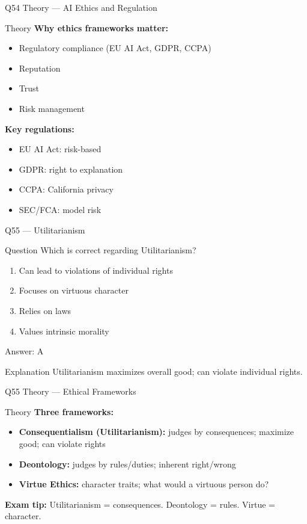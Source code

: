 \documentclass[aspectratio=169,8pt]{beamer}
\begin{document}
	\begin{frame}{Q54 Theory --- AI Ethics and Regulation}
		\begin{block}{Theory}
			\textbf{Why ethics frameworks matter:}
			\begin{itemize}
				\item Regulatory compliance (EU AI Act, GDPR, CCPA)
				\item Reputation
				\item Trust
				\item Risk management
			\end{itemize}
			\textbf{Key regulations:}
			\begin{itemize}
				\item EU AI Act: risk-based
				\item GDPR: right to explanation
				\item CCPA: California privacy
				\item SEC/FCA: model risk
			\end{itemize}
		\end{block}
	\end{frame}
	
	\begin{frame}{Q55 --- Utilitarianism}
		\begin{block}{Question}
			Which is correct regarding Utilitarianism?
		\end{block}
		\begin{enumerate}[label=\Alph*.]
			\item Can lead to violations of individual rights
			\item Focuses on virtuous character
			\item Relies on laws
			\item Values intrinsic morality
		\end{enumerate}
		\begin{exampleblock}{Answer: A}
		\end{exampleblock}
		\begin{block}{Explanation}
			Utilitarianism maximizes overall good; can violate individual rights.
		\end{block}
	\end{frame}
	
	\begin{frame}{Q55 Theory --- Ethical Frameworks}
		\begin{block}{Theory}
			\textbf{Three frameworks:}
			\begin{itemize}
				\item \textbf{Consequentialism (Utilitarianism):} judges by consequences; maximize good; can violate rights
				\item \textbf{Deontology:} judges by rules/duties; inherent right/wrong
				\item \textbf{Virtue Ethics:} character traits; what would a virtuous person do?
			\end{itemize}
			\textbf{Exam tip:} Utilitarianism = consequences. Deontology = rules. Virtue = character.
		\end{block}
	\end{frame}
	
\end{document}
